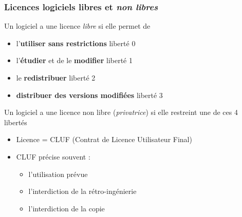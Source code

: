 \documentclass[10pt]{beamer}
\begin{document}
\begin{frame}
  \frametitle{Licences logiciels libres et \emph{non libres}}

  Un logiciel a une licence \emph{libre} si elle permet de
  
  \begin{itemize}
  \item l'\textbf{utiliser sans restrictions} \dotfill{} liberté 0
  \item l'\textbf{étudier} et de le \textbf{modifier} \dotfill{} liberté 1
  \item le \textbf{redistribuer} \dotfill{} liberté 2
  \item \textbf{distribuer des versions modifiées} \dotfill{} liberté 3
  \end{itemize}

  \vfill

  Un logiciel a une licence non libre (\emph{privatrice}) si elle restreint
  une de ces 4 libertés

  \begin{itemize}
  \item Licence = CLUF (Contrat de Licence Utilisateur Final)
  \item CLUF précise souvent :
    \begin{itemize}
    \item l'utilisation prévue
    \item l'interdiction de la rétro-ingénierie
    \item l'interdiction de la copie
    \end{itemize}
  \end{itemize}
\end{frame}

\end{document}
